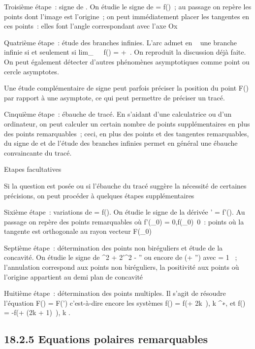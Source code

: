 \documentclass[]{article}
\begin{document}
Troisième étape~: signe de \rho. On étudie le signe de \rho = f(\theta)~; au
passage on repère les points dont l'image est l'origine~; on peut
immédiatement placer les tangentes en ces points~: elles font l'angle
correspondant avec l'axe Ox

Quatrième étape~: étude des branches infinies. L'arc admet en \alpha~
\in\overlineD une branche infinie si et seulement si
lim_\theta\rightarrow~\alpha~~f(\theta) = +\infty~.
On reproduit la discussion déjà faite. On peut également détecter
d'autres phénomènes asymptotiques comme point ou cercle asymptotes.

Une étude complémentaire de signe peut parfois préciser la position du
point F(\theta) par rapport à une asymptote, ce qui peut permettre de
préciser un tracé.

Cinquième étape~: ébauche de tracé. En s'aidant d'une calculatrice ou
d'un ordinateur, on peut calculer un certain nombre de points
supplémentaires en plus des points remarquables~; ceci, en plus des
points et des tangentes remarquables, du signe de \rho et de l'étude des
branches infinies permet en général une ébauche convaincante du tracé.

Etapes facultatives

Si la question est posée ou si l'ébauche du tracé suggère la nécessité
de certaines précisions, on peut procéder à quelques étapes
supplémentaires

Sixième étape~: variations de \rho = f(\theta). On étudie le signe de la dérivée
\rho' = f'(\theta). Au passage on repère des points remarquables où
f'(\theta_0) = 0,f(\theta_0)\neq~0~:
points où la tangente est orthogonale au rayon vecteur F(\theta_0)

Septième étape~: détermination des points non biréguliers et étude de la
concavité. On étudie le signe de \rho^2 + 2\rho'^2 -
\rho\rho'' ou encore de \phi(\phi + \phi'') avec \phi = 1 \over \rho ~;
l'annulation correspond aux points non biréguliers, la positivité aux
points où l'origine appartient au demi plan de concavité

Huitième étape~: détermination des points multiples. Il s'agit de
résoudre l'équation F(\theta) = F(\theta') c'est-à-dire encore les systèmes f(\theta) =
f(\theta + 2k\pi~), k \in {}^∗, et f(\theta) = -f(\theta + (2k + 1)\pi~), k \in {}.

\subsection{18.2.5 Equations polaires remarquables}
\end{document}
